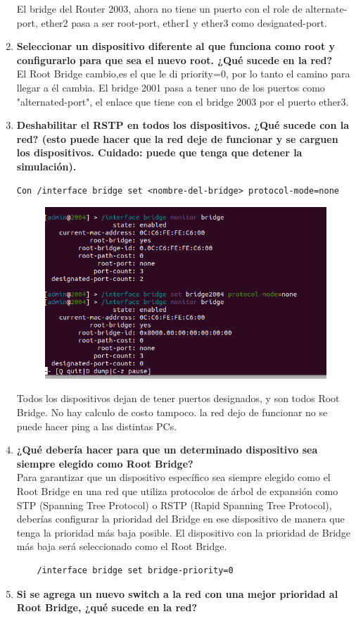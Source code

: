 \documentclass[a4paper]{article}
\begin{document}
\begin{enumerate}
El bridge del Router 2003, ahora no tiene un puerto con el role de alternate-port, ether2 pasa a ser root-port,  ether1 y ether3 como designated-port.

  \item \textbf{Seleccionar un dispositivo diferente al que funciona como root
  	y configurarlo para que sea el nuevo root. ¿Qué sucede en la
  	red?
  }
\\
El Root Bridge cambio,es el que le di priority=0, por lo tanto el camino para llegar a él cambia. El bridge 2001 pasa a tener uno de los puertos como "alternated-port", el enlace que tiene con el bridge 2003 por el puerto ether3.

  \item \textbf{Deshabilitar el RSTP en todos los dispositivos. ¿Qué sucede
  	con la red? (esto puede hacer que la red deje de funcionar
  	y se carguen los dispositivos. Cuidado: puede que tenga que
  	detener la simulación).
}
\\
	
\begin{lstlisting}
Con /interface bridge set <nombre-del-bridge> protocol-mode=none
\end{lstlisting}
\begin{figure}[h]
	\centering
	\includegraphics[width=0.7\linewidth]{screenshot007}
	\caption{}
	\label{fig:screenshot007}
\end{figure}
Todos los dispositivos dejan de tener puertos designados, y son todos Root Bridge. No hay calculo de costo tampoco.
la red dejo de funcionar no se puede hacer ping a las distintas PCs.
\item \textbf{¿Qué debería hacer para que un determinado dispositivo sea
	siempre elegido como Root Bridge?
}
\\
Para garantizar que un dispositivo específico sea siempre elegido como el Root Bridge en una red que utiliza protocolos de árbol de expansión como STP (Spanning Tree Protocol) o RSTP (Rapid Spanning Tree Protocol), deberías configurar la prioridad del Bridge en ese dispositivo de manera que tenga la prioridad más baja posible. El dispositivo con la prioridad de Bridge más baja será seleccionado como el Root Bridge.
\begin{lstlisting}
	/interface bridge set bridge-priority=0
\end{lstlisting}
\item \textbf{Si se agrega un nuevo switch a la red con una mejor prioridad
al Root Bridge, ¿qué sucede en la red?}


\end{enumerate}
\end{document}
